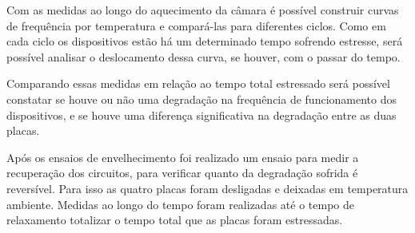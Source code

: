 Com as medidas ao longo do aquecimento da câmara é possível construir curvas de frequência por temperatura e compará-las para diferentes ciclos. Como em cada ciclo os dispositivos estão há um determinado tempo sofrendo estresse, será possível analisar o deslocamento dessa curva, se houver, com o passar do tempo.

Comparando essas medidas em relação ao tempo total estressado será possível constatar se houve ou não uma degradação na frequência de funcionamento dos dispositivos, e se houve uma diferença significativa na degradação entre as duas placas.

Após os ensaios de envelhecimento foi realizado um ensaio para medir a recuperação dos circuitos, para verificar quanto da degradação sofrida é reversível. Para isso as quatro placas foram desligadas e deixadas em temperatura ambiente. Medidas ao longo do tempo foram realizadas até o tempo de relaxamento totalizar o tempo total que as placas foram estressadas.
